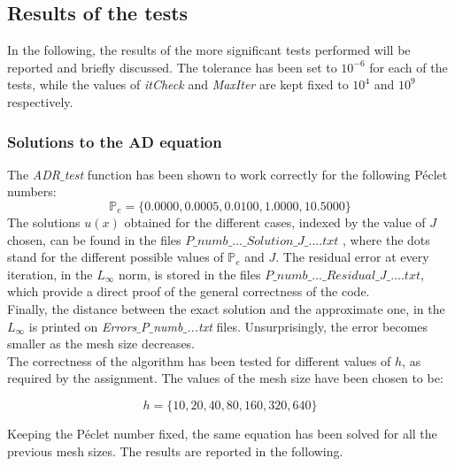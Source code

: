 \documentclass[11pt]{article}
\theoremstyle{theorem}
\theoremstyle{definition}
\begin{document}
\subsection{Results of the tests}
In the following, the results of the more significant tests performed will be reported and briefly discussed. The tolerance has been set to $10^{-6}$ for each of the tests, while the values of \emph{itCheck} and \emph{MaxIter} are kept fixed to $10^4$ and $10^9$ respectively.\\

\subsubsection{Solutions to the AD equation}
The \emph{ADR$\_$test} function has been shown to work correctly for the following  P\'{e}clet numbers:
$$\mathbb{P}_e=\lbrace 0.0000, 0.0005, 0.0100, 1.0000, 10.5000 \rbrace$$
The solutions $u(x)$ obtained for the different cases, indexed by the value of $J$ chosen, can be found in the files $P\_numb\_...\_Solution\_J\_....txt$ , where the dots stand for the different possible values of $\mathbb{P}_e$ and $J$. The residual error at every iteration, in the $L_\infty$ norm, is stored in the files $P\_numb\_...\_Residual\_J\_....txt$, which provide a direct proof of the general correctness of the code.\\
Finally, the distance between the exact solution and the approximate one, in the $L_\infty$ is printed on \emph{Errors$\_$P$\_$numb$\_$...txt} files. Unsurprisingly, the error becomes smaller as the mesh size decreases.\\
The correctness of the algorithm has been tested for different values of $h$, as required by the assignment. The values of the mesh size have been chosen to be:

$$h=\lbrace10, 20, 40, 80, 160, 320, 640\rbrace$$

Keeping the P\'{e}clet number fixed, the same equation has been solved for all the previous mesh sizes. The results are reported in the following.\\
\end{document}
